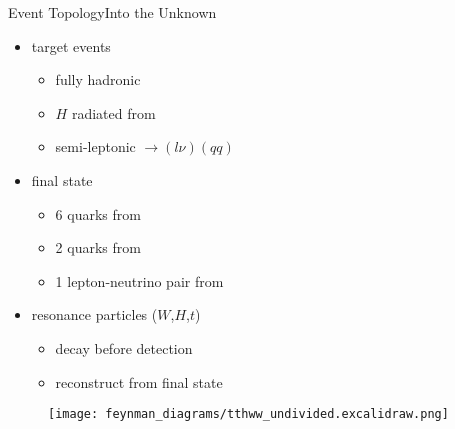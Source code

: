 \documentclass[9pt, aspectratio=169]{beamer}
\begin{document}
\begin{frame}{Event Topology}{Into the Unknown}
	\begin{minipage}{.58\textwidth}
		\begin{itemize}
			\item target \ttHWW events
			\begin{itemize}
				\item fully hadronic \ttbar
				\item $H$ radiated from \ttbar
				\item semi-leptonic \HWW$\rightarrow (l\nu)(qq)$
        	\end{itemize}
			\item final state
			\begin{itemize}
				\item 6 quarks from \ttbar
				\item 2 quarks from \HWW
				\item 1 lepton-neutrino pair from \HWW 
			\end{itemize}
			\item resonance particles ($W$,$H$,$t$)
			\begin{itemize}
				\item decay before detection
				\item reconstruct from final state
			\end{itemize} 
		\end{itemize}
	\end{minipage}
	\begin{minipage}{.4\textwidth}
		\begin{figure}
			\centering
			\texttt{[image: feynman\_diagrams/tthww\_undivided.excalidraw.png]}
		\end{figure}
	\end{minipage}
\end{frame}
\end{document}
